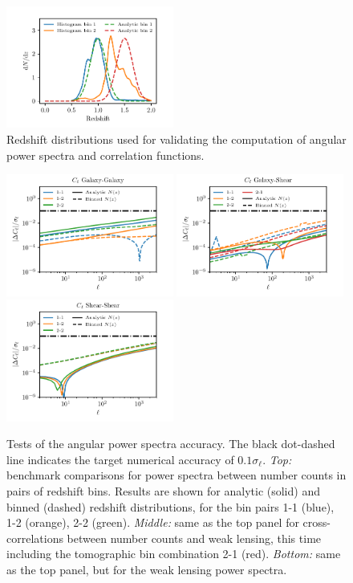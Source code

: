 \documentclass[\docopts]{\docclass}
\begin{document}
\begin{figure}
\centering
\includegraphics[width=0.49\textwidth]{dNdz_codecomp}
\caption{Redshift distributions used for validating the computation of angular power spectra and correlation functions.}
\label{fig:zhistos}
\end{figure}
\begin{figure}
\includegraphics[width=0.49\textwidth]{Cl_dd}
\includegraphics[width=0.49\textwidth]{Cl_dl}
\includegraphics[width=0.49\textwidth]{Cl_ll}
\caption{Tests of the angular power spectra accuracy. The black dot-dashed line indicates the target numerical accuracy of $0.1\sigma_\ell$. {\sl Top:} benchmark comparisons for power spectra between number counts in pairs of redshift bins. Results are shown for analytic (solid) and binned (dashed) redshift distributions, for the bin pairs 1-1 (blue), 1-2 (orange), 2-2 (green). {\sl Middle:} same as the top panel for cross-correlations between number counts and weak lensing, this time including the tomographic bin combination 2-1 (red). {\sl Bottom:} same as the top panel, but for the weak lensing power spectra.}
\label{fig:cls_limber}
\end{figure}
\end{document}
